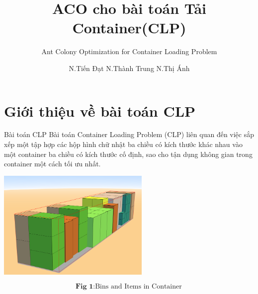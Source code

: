 \documentclass[10pt]{beamer}
\title[CLP with Ant Colony Optimization]{\textbf{ACO cho bài toán Tải Container(CLP)}}
\subtitle{Ant Colony Optimization for Container Loading Problem }
\author[Nhóm 3]{N.Tiến Đạt \quad N.Thành Trung \quad N.Thị Ánh}
\institute[]{}
\date[10/10/2024]
\newenvironment{tres important}[2][]{
	\setkeys{EmphEqEnv}{#2}
	\setkeys{EmphEqOpt}{box={\setlength{\fboxsep}{10pt}\fcolorbox{myNewColorA}{white}},#1}
	\EmphEqMainEnv}
{\endEmphEqMainEnv}
\begin{document}
        \begin{frame}
            \titlepage
        \end{frame}



    \section{Giới thiệu về bài toán CLP}

        \begin{frame}{Bài toán CLP}
            Bài toán Container Loading Problem (CLP) liên quan đến việc sắp xếp một tập hợp các hộp hình chữ nhật ba chiều có kích thước khác nhau vào một container ba chiều có kích thước cố định, sao cho tận dụng không gian trong container một cách tối ưu nhất. 

            \begin{center}
                \includegraphics[width=0.55\textwidth]{assets/IntroForCLP_FirstPic.png}
            \end{center}
            \[{\textbf{Fig 1}: \text{Bins and Items in Container}}\]
        \end{frame}
\end{document}
